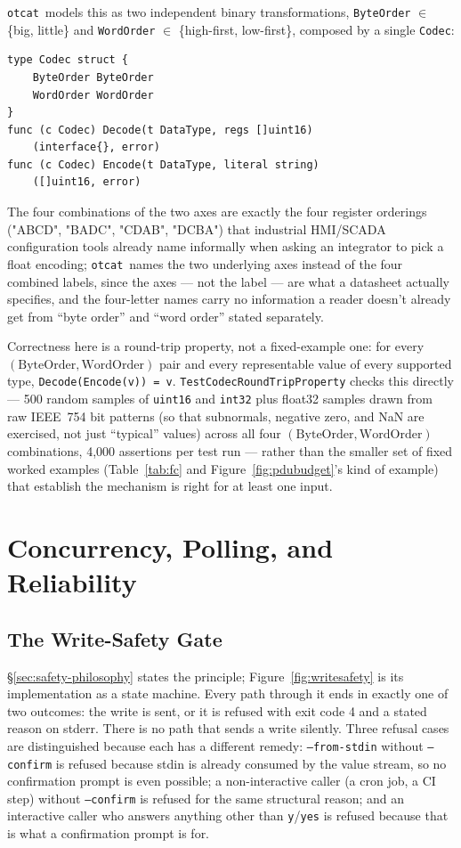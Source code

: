 \documentclass[10pt,conference]{IEEEtran}
\newcommand{\otcat}{\texttt{otcat}}
\newcommand{\code}[1]{\texttt{#1}}
\begin{document}
\otcat\ models this as two independent binary transformations,
\code{ByteOrder} \(\in\) \{big, little\} and \code{WordOrder} \(\in\)
\{high-first, low-first\}, composed by a single \code{Codec}:

\begin{lstlisting}[style=go]
type Codec struct {
    ByteOrder ByteOrder
    WordOrder WordOrder
}
func (c Codec) Decode(t DataType, regs []uint16)
    (interface{}, error)
func (c Codec) Encode(t DataType, literal string)
    ([]uint16, error)
\end{lstlisting}

The four combinations of the two axes are exactly the four register
orderings ("ABCD", "BADC", "CDAB", "DCBA") that industrial HMI/SCADA
configuration tools already name informally when asking an integrator
to pick a float encoding; \otcat\ names the two underlying axes instead
of the four combined labels, since the axes --- not the label --- are
what a datasheet actually specifies, and the four-letter names carry no
information a reader doesn't already get from ``byte order'' and ``word
order'' stated separately.

Correctness here is a round-trip property, not a fixed-example one: for
every \((\mathrm{ByteOrder}, \mathrm{WordOrder})\) pair and every
representable value of every supported type, \code{Decode(Encode(v))
= v}. \code{TestCodecRoundTripProperty} checks this directly --- 500
random samples of \code{uint16} and \code{int32} plus float32 samples
drawn from raw IEEE~754 bit patterns (so that subnormals, negative
zero, and NaN are exercised, not just ``typical'' values) across all
four \((\mathrm{ByteOrder}, \mathrm{WordOrder})\) combinations, 4{,}000
assertions per test run --- rather than the smaller set of fixed
worked examples (Table~\ref{tab:fc} and Figure~\ref{fig:pdubudget}'s
kind of example) that establish the mechanism is right for at least one
input.



\section{Concurrency, Polling, and Reliability}
\label{sec:reliability}

\subsection{The Write-Safety Gate}

\S\ref{sec:safety-philosophy} states the principle; Figure~\ref{fig:writesafety}
is its implementation as a state machine. Every path through it ends in
exactly one of two outcomes: the write is sent, or it is refused with
exit code 4 and a stated reason on stderr. There is no path that sends
a write silently. Three refusal cases are distinguished because each
has a different remedy: \code{--from-stdin} without \code{--confirm}
is refused because stdin is already consumed by the value stream, so no
confirmation prompt is even possible; a non-interactive caller (a cron
job, a CI step) without \code{--confirm} is refused for the same
structural reason; and an interactive caller who answers anything other
than \code{y}/\code{yes} is refused because that is what a
confirmation prompt is for.
\end{document}
